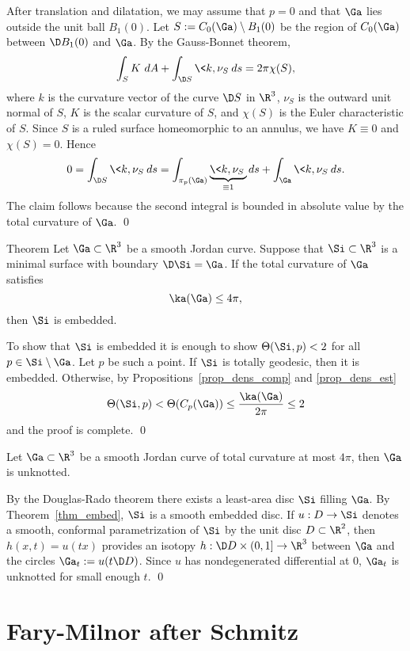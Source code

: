 \proof
After translation and dilatation, we may assume that $p=0$ and that $\Ga$ lies outside the unit ball $B_1(0)$.
Let $S:=C_0(\Ga)\setminus B_1(0)$ be the region of $C_0(\Ga)$ between $\D B_1(0)$ and $\Ga$. By the Gauss-Bonnet theorem,
\[\int_S K\ dA+\int_{\D S}\<k,\nu_S\> ds=2\pi\chi(S), \]
where $k$ is the curvature vector of the curve $\D S$ in $\R^3$, $\nu_S$ is the outward unit normal
of $S$, $K$ is the scalar curvature of $S$, and $\chi(S)$ is the Euler characteristic of $S$.
Since $S$ is a ruled surface homeomorphic to an annulus, we have $K\equiv 0$ and $\chi(S)=0$. Hence
\[0=\int_{\D S}\<k,\nu_S\> ds=\int_{\pi_p(\Ga)}\underbrace{\<k,\nu_S\>}_{\equiv 1} ds+\int_{\Ga}\<k,\nu_S\> ds.\]
The claim follows because the second integral is bounded in absolute value by the total curvature of $\Ga$.
\qed


\begin{thm}{Theorem}\label{thm_embed}
Let $\Ga\subset\R^3$ be a smooth Jordan curve.
Suppose that $\Si\subset\R^3$ is a minimal surface with boundary $\D\Si=\Ga$.
If the total curvature of $\Ga$ satisfies
\[\ka(\Ga)\leq 4\pi,\]
then $\Si$ is embedded. 
\end{thm}

\proof
To show that $\Si$ is embedded it is enough to show $\Theta(\Si,p)<2$ for all $p\in\Si\setminus\Ga$.
Let $p$ be such a point.
If $\Si$ is totally geodesic, then it is embedded.
Otherwise, by Propositions~\ref{prop_dens_comp} and \ref{prop_dens_est}
\[\Theta(\Si,p)<\Theta(C_p(\Ga))\leq\frac{\ka(\Ga)}{2\pi}\leq 2\]
and the proof is complete.
\qed

Let $\Ga\subset\R^3$ be a smooth Jordan curve of total curvature at most $4\pi$, then $\Ga$ is unknotted.
\ecor

\proof
By the Douglas-Rado theorem there exists a least-area disc $\Si$ filling $\Ga$.
By Theorem~\ref{thm_embed}, $\Si$ is a
smooth embedded disc. If $u:D\to\Si$ denotes a smooth, conformal parametrization of $\Si$ by the
unit disc $D\subset\R^2$, then $h(x,t)=u(tx)$ provides an isotopy $h:\D D\times(0,1]\to\R^3$ between $\Ga$
and the circles $\Ga_t:=u(t\D D)$. Since $u$ has nondegenerated differential at $0$, $\Ga_t$ is unknotted for small enough $t$.
\qed



\section{Fary-Milnor after Schmitz}

